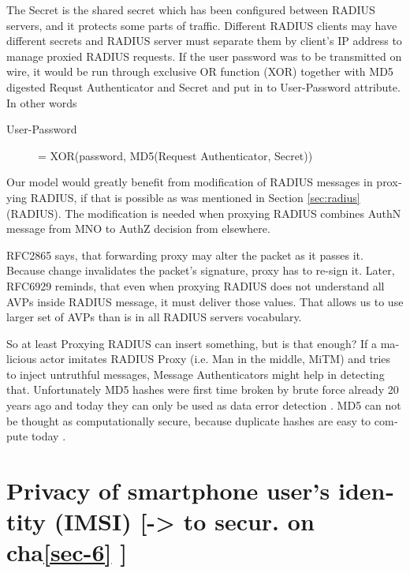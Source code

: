 \documentclass[12pt,a4paper,english]{tutthesis}
\begin{document}
\begin{otherlanguage}{english}
The Secret is the shared secret which has been configured between RADIUS servers,
and it protects some parts of traffic. 
Different RADIUS clients may have different
secrets and RADIUS server must separate them by client's IP address to
manage proxied RADIUS requests. \cite{radiusbook}
If the user password was to be transmitted on wire, it would be run
through exclusive OR function (XOR) together with MD5 digested Requst
Authenticator and Secret and put in to User-Password attribute.  In
other words
\begin{description}
\item[{User-Password}] = XOR(password, MD5(Request Authenticator, Secret))
\end{description}





Our model would greatly benefit from modification of RADIUS messages in proxying
RADIUS, if that is possible as was mentioned in Section \ref{sec:radius}(RADIUS).
The modification is needed when proxying RADIUS combines AuthN message
from MNO to AuthZ decision from elsewhere.





RFC2865 \cite{rfc2865} says, that forwarding proxy may alter the packet
as it passes it.
Because change invalidates the packet's signature, proxy has to
re-sign it. Later, RFC6929 \cite{rfc6929} reminds, that even when
proxying RADIUS does not understand all AVPs inside RADIUS message, it
must deliver those values. That allows us to use larger set of AVPs 
than is in all RADIUS servers vocabulary.


So at least Proxying RADIUS can insert something, but is that enough?
If a malicious actor imitates RADIUS Proxy (i.e. Man in the
middle, MiTM) and tries
to inject untruthful messages, Message Authenticators might help in detecting
that. Unfortunately MD5 hashes were first time broken by brute force
already 20 years ago and today they can only be used as data error
detection \cite[p.2]{rfc6151}. MD5 can not be thought as computationally secure,
because duplicate hashes are easy to compute today  \cite{xie2013fast}. 




\section{Privacy of smartphone user's identity (IMSI) [-> to secur. on cha\ref{sec-6} ]}
\label{sec-4-7}



\end{otherlanguage}
\end{document}
